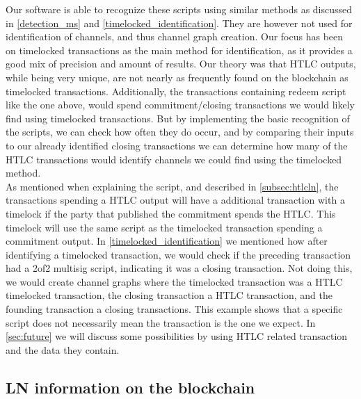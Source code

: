 Our software is able to recognize these scripts using similar methods as discussed in \cref{detection_ms} and \cref{timelocked_identification}. 
They are however not used for identification of channels, and thus channel graph creation. Our focus has been on timelocked transactions as the main method for identification, as it provides a good mix of precision and amount of results. Our theory was that HTLC outputs, while being very unique, are not nearly as frequently found on the blockchain as timelocked transactions. Additionally, the transactions containing redeem script like the one above, would spend commitment/closing transactions we would likely find using timelocked transactions.
But by implementing the basic recognition of the scripts, we can check how often they do occur, and by comparing their inputs to our already identified closing transactions we can determine how many of the HTLC transactions would identify channels we could find using the timelocked method.
\\

As mentioned when explaining the script, and described in \cref{subsec:htlcln}, the transactions spending a HTLC output will have a additional transaction with a timelock if the party that published the commitment spends the HTLC. This timelock will use the same script as the timelocked transaction spending a commitment output. In \cref{timelocked_identification} we mentioned how after identifying a timelocked transaction, we would check if the preceding transaction had a 2of2 multisig script, indicating it was a closing transaction. Not doing this, we would create channel graphs where the timelocked transaction was a HTLC timelocked transaction, the closing transaction a HTLC transaction, and the founding transaction a closing transactions. This example shows that a specific script does not necessarily mean the transaction is the one we expect. In \cref{sec:future} we will discuss some possibilities by using HTLC related transaction and the data they contain.



\subsection{LN information on the blockchain}
\label{subsec:information_ln}

